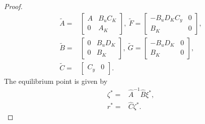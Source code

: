 \begin{proof}
\begin{align*}
\tilde{A}=&
\begin{bmatrix}
A & B_uC_K \\
0 & A_K
\end{bmatrix}, \
\tilde{F} = 
\begin{bmatrix}
-B_uD_KC_y & 0\\
B_K & 0
\end{bmatrix}, \\
\tilde{B}= &
\begin{bmatrix}
0 & B_uD_K \\
0 & B_K
\end{bmatrix}, \
\tilde{G} = 
\begin{bmatrix}
-B_uD_K & 0\\
B_K & 0
\end{bmatrix}, \\
\tilde{C}= &
\begin{bmatrix}
C_y & 0
\end{bmatrix}.
\end{align*}
The equilibrium point is given by
\begin{align}
\zeta^*=&\hat{A}^{-1}\hat{B}\xi^*, \nonumber \\
r^*=&\hat{C}\zeta^*.
\end{align}


\end{proof}
